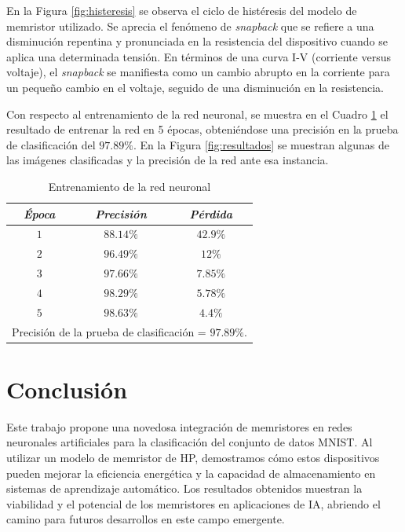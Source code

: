 \documentclass[conference]{IEEEtran}
\begin{document}
En la Figura \ref{fig:histeresis} se observa el ciclo de histéresis del modelo de memristor utilizado. Se aprecia el fenómeno de \textit{snapback} que se refiere a una disminución repentina y pronunciada en la resistencia del dispositivo cuando se aplica una determinada tensión. En términos de una curva I-V (corriente versus voltaje), el \textit{snapback} se manifiesta como un cambio abrupto en la corriente para un pequeño cambio en el voltaje, seguido de una disminución en la resistencia.

Con respecto al entrenamiento de la red neuronal, se muestra en el Cuadro \ref{tab:entrenamiento} el resultado de entrenar la red en 5 épocas, obteniéndose una precisión en la prueba de clasificación del $97.89\%$. En la Figura \ref{fig:resultados} se muestran algunas de las imágenes clasificadas y la precisión de la red ante esa instancia.

\begin{table}[htbp]
\caption{Entrenamiento de la red neuronal}
\begin{center}
\begin{tabular}{|c|c|c|}
\hline
\cline{1-3} 
\textbf{\textit{Época}} & \textbf{\textit{Precisión}}& \textbf{\textit{Pérdida}} \\
\hline
$1$ & $88.14\%$ & $42.9\%$ \\
\hline
$2$ & $96.49\%$ & $12\%$ \\
\hline
$3$ & $97.66\%$ & $7.85\%$ \\
\hline
$4$ & $98.29\%$ & $5.78\%$ \\
\hline
$5$ & $98.63\%$ & $4.4\%$ \\
\hline
\multicolumn{3}{l}{Precisión de la prueba de clasificación = $97.89\%$.}
\end{tabular}
\label{tab:entrenamiento}
\end{center}
\end{table}

\section*{Conclusión}

Este trabajo propone una novedosa integración de memristores en redes neuronales artificiales para la clasificación del conjunto de datos MNIST. Al utilizar un modelo de memristor de HP, demostramos cómo estos dispositivos pueden mejorar la eficiencia energética y la capacidad de almacenamiento en sistemas de aprendizaje automático. Los resultados obtenidos muestran la viabilidad y el potencial de los memristores en aplicaciones de IA, abriendo el camino para futuros desarrollos en este campo emergente.
\end{document}
